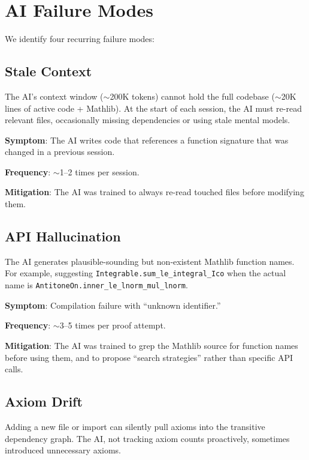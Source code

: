 \documentclass[11pt,a4paper]{article}
\newcommand{\lean}[1]{\texttt{#1}}
\begin{document}
\section{AI Failure Modes}
\label{sec:failures}

We identify four recurring failure modes:

\subsection{Stale Context}

The AI's context window ($\sim$200K tokens) cannot hold the full
codebase ($\sim$20K lines of active code + Mathlib). At the start
of each session, the AI must re-read relevant files, occasionally
missing dependencies or using stale mental models.

\textbf{Symptom}: The AI writes code that references a function
signature that was changed in a previous session.

\textbf{Frequency}: $\sim$1--2 times per session.

\textbf{Mitigation}: The AI was trained to always re-read touched
files before modifying them.

\subsection{API Hallucination}

The AI generates plausible-sounding but non-existent Mathlib function
names. For example, suggesting \lean{Integrable.sum\_le\_integral\_Ico}
when the actual name is \lean{AntitoneOn.inner\_le\_lnorm\_mul\_lnorm}.

\textbf{Symptom}: Compilation failure with ``unknown identifier.''

\textbf{Frequency}: $\sim$3--5 times per proof attempt.

\textbf{Mitigation}: The AI was trained to grep the Mathlib source
for function names before using them, and to propose ``search
strategies'' rather than specific API calls.

\subsection{Axiom Drift}

Adding a new file or import can silently pull axioms into the
transitive dependency graph. The AI, not tracking axiom counts
proactively, sometimes introduced unnecessary axioms.
\end{document}
